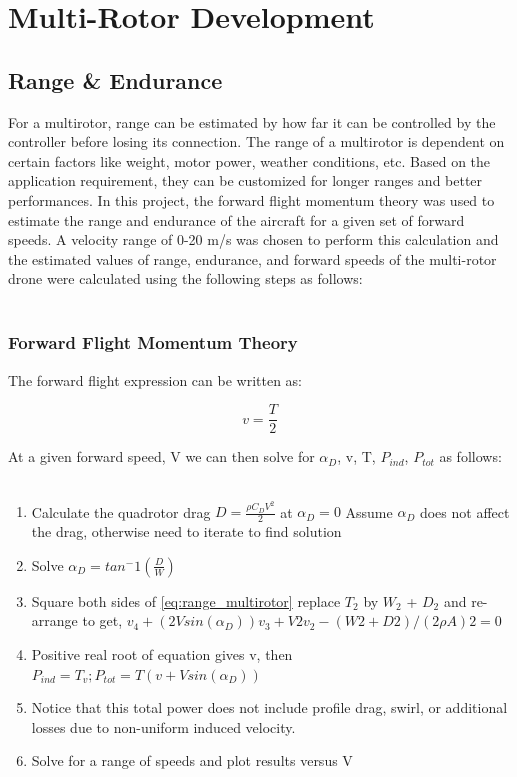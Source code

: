 \chapter{Multi-Rotor Development}
\label{chap:MR}
\section{Range \& Endurance}
For a multirotor, range can be estimated by how far it can be controlled by the controller before losing its connection. The range of a multirotor is dependent on certain factors like weight, motor power, weather conditions, etc. Based on the application requirement, they can be customized for longer ranges and better performances. In this project, the forward flight momentum theory was used to estimate the range and endurance of the aircraft for a given set of forward speeds. A velocity range of 0-20 m/s was chosen to perform this calculation and the estimated values of range, endurance, and forward speeds of the multi-rotor drone were calculated using the following steps as follows: \\\

\subsection{Forward Flight Momentum Theory}

The forward flight expression can be written as:

\begin{equation}
	\label{eq:range_multirotor}
	v = \frac{T}{2} 
\end{equation}

At a given forward speed, V we can then solve for $ α_D $, v, T, $ P_{ind} $, $ P_{tot} $ as follows: \\\

\begin{enumerate}
	\item Calculate the quadrotor drag $ D = \frac{\rho C_D V^2}{2} $ at $ α_D = 0 $ Assume $ α_D $ does not affect the drag, otherwise need to iterate to find solution
	\item Solve $ α_D = tan^-1(\frac{D}{W}) $
	\item Square both sides of \ref{eq:range_multirotor} replace $ T_2 $ by $ W_2 $ + $ D_2 $ and re-arrange to get, $ v_4 + (2 V sin(α_D)) v_3 + V 2 v_2 −(W2 + D2)/(2 ρ A)2 = 0 $
	\item Positive real root of equation gives v, then $ P_{ind} = T_v; P_{tot} = T (v + V sin(α_D)) $
	\item Notice that this total power does not include profile drag, swirl, or additional
	losses due to non-uniform induced velocity.
	\item Solve for a range of speeds and plot results versus V
		
\end{enumerate}

